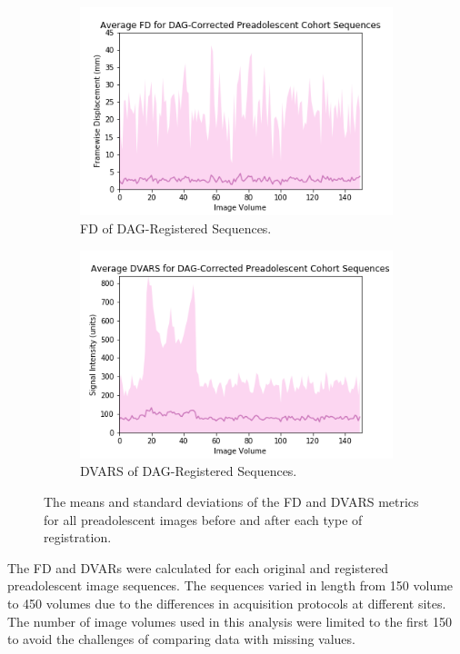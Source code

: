 \begin{figure}[]
	\begin{subfigure}{0.4\textwidth}
		\centering
		\includegraphics[width=1.0\textwidth]{6/figures/preads-dag-fd-150.png}
		\caption{FD of DAG-Registered Sequences.}
	\end{subfigure}
	\hspace{0.05\textwidth}
	\begin{subfigure}{0.4\textwidth}
		\centering
		\includegraphics[width=1.0\textwidth]{6/figures/preads-dag-dvars-150.png}
		\caption{DVARS of DAG-Registered Sequences.}
	\end{subfigure}
\caption{The means and standard deviations of the FD and DVARS metrics for all preadolescent images before and after each type of registration.}
\label{fig:pread-power-dists}
\end{figure}

The FD and DVARs were calculated for each original and registered preadolescent image sequences. The  sequences varied in length from 150 volume to 450 volumes due to the differences in acquisition protocols at different sites. The number of image volumes used in this analysis were limited to the first 150 to avoid the challenges of comparing data with missing values.


